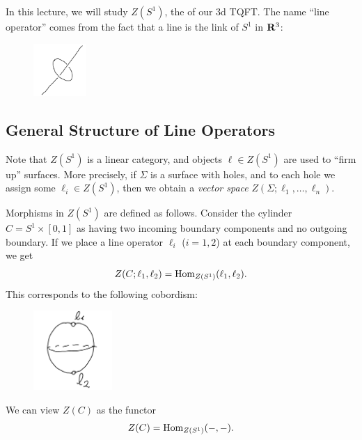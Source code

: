
In this lecture, we will study $Z(S^1)$, the  of our 3d TQFT.
The name ``line operator'' comes from the fact that a line is the link of $S^1$ in $\mathbf{R}^3$: %

\begin{figure}[htp]
    \centering
    \includegraphics[width=2cm]{frilec1graphics/link.png}
\end{figure}


\subsection{General Structure of Line Operators}

Note that $Z(S^1)$ is a linear category, and objects $\ell \in Z(S^1)$ are used to ``firm up'' surfaces.
More precisely, if $\Sigma$ is a surface with holes, and to each hole we assign some $\ell_i \in Z(S^1)$, then we obtain a \emph{vector space} $Z(\Sigma; \ell_1, \dots, \ell_n)$.

Morphisms in $Z(S^1)$ are defined as follows.
Consider the cylinder $C = S^1 \times [0, 1]$ as having two incoming boundary components and no outgoing boundary.
If we place a line operator $\ell_i$ ($i = 1, 2$) at each boundary component,
we get %
\begin{equation}
Z(C; \ell_1, \ell_2) = \mathrm{Hom}_{Z(S^1)}(\ell_1, \ell_2).
\end{equation}
This corresponds to the following cobordism:
\begin{figure}[htp]
    \centering
    \includegraphics[width=3cm]{frilec1graphics/hom.png}
\end{figure}

\noindent We can view $Z(C)$ as the functor
\begin{equation}
Z(C) = \mathrm{Hom}_{Z(S^1)}(-, -).
\end{equation}

